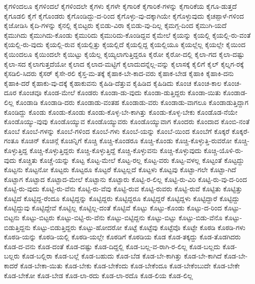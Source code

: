 {ಕೈಗಳಿಂದಲೂ
ಕೈಗಳಿಂದಲೆ
ಕೈಗಳಿಂದಲೇ
ಕೈಗಳು
ಕೈಗಳೇ
ಕೈಗಾರಿಕೆ
ಕೈಗಾರಿಕೆ-ಗಳನ್ನು
ಕೈಗಾರಿಕೆಯ
ಕೈಗೂ-ಡುತ್ತದೆ
ಕೈಗೂಡಲಿ
ಕೈಗೆ
ಕೈಗೊಂಡರು
ಕೈಗೊಂಡಿದ್ದು-ದ-ರಿಂದ
ಕೈಗೊಳ್ಳು-ವು-ದಕ್ಕಾಗಿಯೇ
ಕೈಗೊಳ್ಳುವುದು
ಕೈಚಪ್ಪಾಳೆ-ಗಳಿಂದ
ಕೈಜೋಡಿಸಿ
ಕೈದಿ-ಗಳನ್ನು
ಕೈನಲ್ಲಿ
ಕೈಬಿಟ್ಟರು
ಕೈಬಿಡು-ವಿರಾ
ಕೈಬಿಡು-ವು-ದಿಲ್ಲ
ಕೈಮಗ್ಗ-ದಿಂದ
ಕೈಮುಗಿ-ಯದೆ
ಕೈಮುಗಿದು
ಕೈಮುಗಿದು-ಕೊಂಡು
ಕೈಮುರಿದು
ಕೈಮುರಿದು-ಕೊಂಡಿದ್ದವ
ಕೈಮೇಲೆ
ಕೈಯನ್ನು
ಕೈಯಲ್ಲಿ
ಕೈಯಲ್ಲಿ-ರು-ವಂತೆ
ಕೈಯಲ್ಲಿ-ರು-ವುದು
ಕೈಯಲ್ಲಿ-ರುವ
ಕೈಯಲ್ಲಿತ್ತು
ಕೈಯಲ್ಲಿದೆ
ಕೈಯಲ್ಲಿದ್ದ
ಕೈಯಲ್ಲಿಯೂ
ಕೈಯಲ್ಲೆಲ್ಲ
ಕೈಯಲ್ಲೇ
ಕೈಯಿಂದ
ಕೈಯಿಂದಲೂ
ಕೈಯಿಂದಲೇ
ಕೈಯಿಟ್ಟು
ಕೈಯೆಲ್ಲ
ಕೈಯ್ಯಲಾಗುತ್ತಿದ್ದರೂ
ಕೈರೋ
ಕೈರೋ-ದಲ್ಲಿ
ಕೈಲಾ-ಗದ
ಕೈಲಾ-ದಷ್ಟು
ಕೈಲಾ-ಸದ
ಕೈಲಾಗುತ್ತದೆಯೋ
ಕೈಲಾದ
ಕೈಲಾದ-ಮಟ್ಟಿಗೆ
ಕೈಲಾದುದನ್ನೆಲ್ಲ-ವನ್ನು
ಕೈಲಾಸಕ್ಕೆ
ಕೈಲಿಗೆ
ಕೈಲ್
ಕೈಲ್ನಗ-ರಕ್ಕೆ
ಕೈಸಡಿಲಿ-ಸಿದರು
ಕೈಸರ್
ಕೈಸೇ-ರಲಿ
ಕೈಸ್ತ-ಮ-ತಕ್ಕೆ
ಕೈಹಾಕ-ಬೇ-ಕಾದ-ವರು
ಕೈಹಾಕ-ಬೇಡ
ಕೈಹಾಕಿ
ಕೈಹಾಕಿ-ದನು
ಕೈಹಾಕಿ-ದರೆ
ಕೈಹಾಕು-ವು-ದಕ್ಕೆ
ಕೈಹಾಕುವನು
ಕೈಹಿಡಿ-ದೆತ್ತುವ
ಕೈಹಿಡಿದ
ಕೈಹಿಡಿದು
ಕೊಂಚ
ಕೊಂಚ-ಕಾಲ
ಕೊಂಚ-ದೂರ
ಕೊಂಚವೂ
ಕೊಂಡ-ಮೇಲೆ
ಕೊಂಡರು
ಕೊಂಡಾ-ಡು-ವುದು
ಕೊಂಡಾ-ಡುತ್ತಿದ್ದರು
ಕೊಂಡಾ-ಯಿತು
ಕೊಂಡಾಡ-ಲಿಲ್ಲ
ಕೊಂಡಾಡಿ
ಕೊಂಡಾಡಿ-ದರು
ಕೊಂಡಾಡು-ವಂತಹ
ಕೊಂಡಾಡು-ವರು
ಕೊಂಡಾಡು-ವಾಗಲೂ
ಕೊಂಡಾಡುತ್ತಿದ್ದಾಗ
ಕೊಂಡಿದ್ದು
ಕೊಂಡು
ಕೊಂಡು-ಕೊಂಡು
ಕೊಂಡು-ಕೊಳ್ಳ-ಬೇ-ಕಾಗಿತ್ತು
ಕೊಂಡು-ಕೊಳ್ಳ-ಬೇಕು
ಕೊಂಡೊಡ-ನೆಯೇ
ಕೊಂಡೊಯ್ಯು-ವುವು
ಕೊಂಡೊಯ್ಯುವ
ಕೊಂಡೊಯ್ಯುವರು
ಕೊಂಡೊಯ್ಯುವಾಗ
ಕೊಂದರು
ಕೊಂದಾದ
ಕೊಂಬಿ-ನಂತೆ
ಕೊಂಬೆ
ಕೊಂಬೆ-ಗಳನ್ನು
ಕೊಂಬೆ-ಗಳಿಂದ
ಕೊಂಬೆ-ಗಳು
ಕೊಂಬೆ-ಯನ್ನು
ಕೊಂಬೆ-ಯಿಂದ
ಕೊಂಬೆಗೆ
ಕೊಕ್ಕರೆ
ಕೊಕ್ಕರೆ-ಗಂತೂ
ಕೊಚಿನ್
ಕೊಚಿನ್ಗೆ
ಕೊಚಿನ್ನಿಗೆ
ಕೊಚ್ಚಿ
ಕೊಚ್ಚಿ-ಕೊಂಡರೂ
ಕೊಚ್ಚಿ-ಕೊಂಡು
ಕೊಚ್ಚಿ-ಕೊಳ್ಳುತ್ತಿ-ರುವರೋ
ಕೊಚ್ಚಿ-ಕೊಳ್ಳುತ್ತಿದ್ದ
ಕೊಚ್ಚಿ-ಕೊಳ್ಳುತ್ತಿದ್ದರು
ಕೊಚ್ಚಿ-ಕೊಳ್ಳುತ್ತಿದ್ದೆ
ಕೊಚ್ಚಿ-ಕೊಳ್ಳುವನು
ಕೊಚ್ಚಿ-ಕೊಳ್ಳುವುದು
ಕೊಚ್ಚಿ-ಯೊಳಿ-ರು-ವುದು
ಕೊಚ್ಚಿತು
ಕೊಚ್ಚೆ-ಯನ್ನು
ಕೊಟ್ಟ
ಕೊಟ್ಟ-ಮೇಲೆ
ಕೊಟ್ಟ-ರಲ್ಲ
ಕೊಟ್ಟ-ವರು
ಕೊಟ್ಟ-ವಳಲ್ಲ
ಕೊಟ್ಟಂತೆ
ಕೊಟ್ಟದ್ದು
ಕೊಟ್ಟನು
ಕೊಟ್ಟನೋ
ಕೊಟ್ಟರು
ಕೊಟ್ಟರೂ
ಕೊಟ್ಟರೆ
ಕೊಟ್ಟಲ್ಲದೆ
ಕೊಟ್ಟಳು
ಕೊಟ್ಟವು
ಕೊಟ್ಟಾ-ಗಲೇ
ಕೊಟ್ಟಾ-ಗಿದೆ
ಕೊಟ್ಟಾಗ
ಕೊಟ್ಟಾದ
ಕೊಟ್ಟಾದ-ಮೇಲೆ
ಕೊಟ್ಟಾನು
ಕೊಟ್ಟಾರು
ಕೊಟ್ಟಿ-ರ-ಲಿಲ್ಲ
ಕೊಟ್ಟಿ-ರು-ವಿರಿ
ಕೊಟ್ಟಿ-ರು-ವು-ದ-ರಿಂದ
ಕೊಟ್ಟಿ-ರು-ವುದು
ಕೊಟ್ಟಿ-ರು-ವೆನು
ಕೊಟ್ಟಿ-ರು-ವೆವು
ಕೊಟ್ಟಿ-ರುವ
ಕೊಟ್ಟಿ-ರುವರು
ಕೊಟ್ಟಿ-ರುವೆ
ಕೊಟ್ಟಿತು
ಕೊಟ್ಟಿತ್ತು
ಕೊಟ್ಟಿದೆ
ಕೊಟ್ಟಿದ್ದ-ರೆಂದೂ
ಕೊಟ್ಟಿದ್ದನ್ನು
ಕೊಟ್ಟಿದ್ದರು
ಕೊಟ್ಟಿದ್ದರೂ
ಕೊಟ್ಟಿದ್ದರೆ
ಕೊಟ್ಟಿದ್ದಳು
ಕೊಟ್ಟಿದ್ದಾರೆ
ಕೊಟ್ಟಿದ್ದು
ಕೊಟ್ಟಿದ್ದುವು
ಕೊಟ್ಟಿದ್ದೇವೆ
ಕೊಟ್ಟಿಲ್ಲ
ಕೊಟ್ಟಿಲ್ಲ-ದಂತೆ
ಕೊಟ್ಟಿವೆ
ಕೊಟ್ಟು
ಕೊಟ್ಟು-ಕೊಂಡು
ಕೊಟ್ಟು-ದ-ರಿಂದ
ಕೊಟ್ಟು-ಬಿಟ್ಟನು
ಕೊಟ್ಟು-ಬಿಟ್ಟರು
ಕೊಟ್ಟು-ಬಿಟ್ಟಿ-ರು-ವೆನು
ಕೊಟ್ಟು-ಬಿಟ್ಟಿದ್ದನು
ಕೊಟ್ಟು-ಬಿಟ್ಟು
ಕೊಟ್ಟು-ಬಿಡು-ವೆನೊ
ಕೊಟ್ಟು-ಬಿಡುತ್ತಿದ್ದನು
ಕೊಟ್ಟು-ಬಿಡುತ್ತಿದ್ದರು
ಕೊಟ್ಟು-ಹೋದರೋ
ಕೊಟ್ಟೆ
ಕೊಟ್ಟೆವು
ಕೊಟ್ಟೆವೊ
ಕೊಟ್ಟೇ
ಕೊಠಡಿ
ಕೊಠಡಿ-ಗಳು
ಕೊಠಡಿ-ಯನ್ನು
ಕೊಠಡಿ-ಯಲ್ಲಿ
ಕೊಠಡಿ-ಯಲ್ಲೇ
ಕೊಠಡಿಗೆ
ಕೊಠಡಿಯ
ಕೊಡ
ಕೊಡ-ತಕ್ಕದ್ದು
ಕೊಡ-ತೊಡಗಿದರು
ಕೊಡ-ದ-ವನು
ಕೊಡ-ದಂತೆ
ಕೊಡ-ದಷ್ಟು
ಕೊಡ-ದಿದ್ದಲ್ಲಿ
ಕೊಡ-ಬಲ್ಲ-ವ-ರಾಗಿ-ರ-ಲಿಲ್ಲ
ಕೊಡ-ಬಲ್ಲದು
ಕೊಡ-ಬಲ್ಲರು
ಕೊಡ-ಬಲ್ಲಿರಾ
ಕೊಡ-ಬಲ್ಲೆ
ಕೊಡ-ಬಹುದು
ಕೊಡ-ಬೆಡ
ಕೊಡ-ಬೇ-ಕಾಗಿತ್ತು
ಕೊಡ-ಬೇ-ಕಾಗಿದೆ
ಕೊಡ-ಬೇ-ಕಾದರೆ
ಕೊಡ-ಬೇಕಾ-ಯಿತು
ಕೊಡ-ಬೇಕು
ಕೊಡ-ಬೇಕೆಂದು
ಕೊಡ-ಬೇಕೆಂದೂ
ಕೊಡ-ಬೇಕೆಂಬುದೇ
ಕೊಡ-ಬೇಕೇ
ಕೊಡ-ಬೇಕೋ
ಕೊಡ-ಬೇಡ
ಕೊಡ-ಲಾ-ರದು
ಕೊಡ-ಲಾ-ರದೊ
ಕೊಡ-ಲಿಯ
ಕೊಡ-ಲಿಲ್ಲ
}

